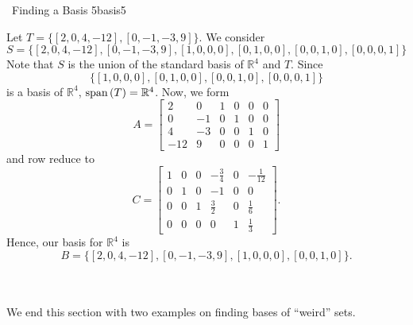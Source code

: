         \begin{example}{\Difficulty\,\Difficulty\,\,Finding a Basis 5}{basis5}

            Let \(T=\{[2,0,4,-12],[0,-1,-3,9]\}\). We consider 
            \begin{equation*}
                S=\{[2,0,4,-12],[0,-1,-3,9],[1,0,0,0],[0,1,0,0],[0,0,1,0],[0,0,0,1]\}
            \end{equation*}
            Note that \(S\) is the union of the standard basis of \(\mathbb{R}^4\) and \(T\). Since
            \begin{equation*}
                \{[1,0,0,0],[0,1,0,0],[0,0,1,0],[0,0,0,1]\}
            \end{equation*}
            is a basis of \(\mathbb{R}^4\), \(\text{span\,}(T)=\mathbb{R}^4\). Now, we form
            \begin{equation*}
                A=\begin{bmatrix}
                    2 & 0 & 1 & 0 & 0 & 0 \\
                    0 & -1 & 0 & 1 & 0 & 0 \\
                    4 & -3 & 0 & 0 & 1 & 0 \\
                    -12 & 9 & 0 & 0 & 0 & 1
                \end{bmatrix}
            \end{equation*}
            and row reduce to
            \begin{equation*}
                C=\begin{bmatrix}
                    1 & 0 & 0 & -\frac{3}{4} & 0 & -\frac{1}{12} \\
                    0 & 1 & 0 & -1 & 0 & 0 \\
                    0 & 0 & 1 & \frac{3}{2} & 0 & \frac{1}{6} \\
                    0 & 0 & 0 & 0 & 1 & \frac{1}{3}
                \end{bmatrix}.
            \end{equation*}
            Hence, our basis for \(\mathbb{R}^4\) is
            \begin{equation*}
                B=\{[2,0,4,-12],[0,-1,-3,9],[1,0,0,0],[0,0,1,0]\}.
            \end{equation*}
        \end{example}
        \pagebreak
        \vphantom
        \\
        \\
        We end this section with two examples on finding bases of ``weird'' sets.
